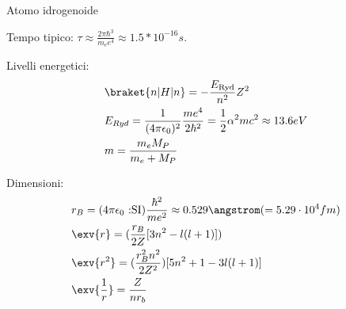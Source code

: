 \begin{frame}{Atomo idrogenoide}
    
Tempo tipico: $\tau\approx \frac{2\pi\hbar^3}{m_ee^4}\approx1.5*10^{-16} s$.
 
Livelli energetici:
\begin{align*}
&\braket{n|H|n}=-\frac{E_{\text{Ryd}}}{n^2}Z^2\\ &E_{Ryd}=\frac{1}{(4\pi\epsilon_0)^2}\frac{me^4}{2\hbar^2}=\frac{1}{2}\alpha^2mc^2\approx13.6eV\\
&m=\frac{m_eM_P}{m_e+M_P}
\end{align*}

Dimensioni:
\begin{align*}
&r_B=(4\pi\epsilon_0 \text{ :SI})\frac{\hbar^2}{me^2}\approx0.529\angstrom (=5.29 \cdot10^{4} fm)\\ &\exv{r}=(\frac{r_B}{2Z}[3n^2-l(l+1)])\\ &\exv{r^2}=(\frac{r_B^2n^2}{2Z^2})[5n^2+1-3l(l+1)]\\ &\exv{\frac{1}{r}}=\frac{Z}{nr_b}
\end{align*}

\end{frame}

